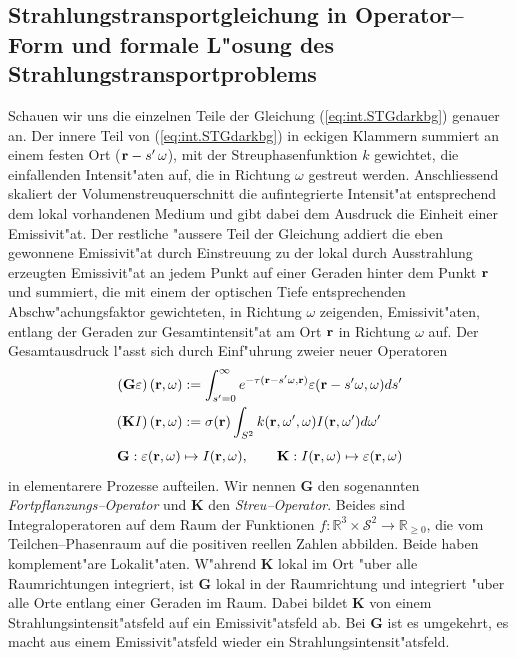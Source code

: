 	\subsection{Strahlungstransportgleichung in Operator--Form und formale L"osung des Strahlungstransportproblems}
	Schauen wir uns die einzelnen Teile der Gleichung (\ref{eq:int.STGdarkbg}) genauer an.
	Der innere Teil von (\ref{eq:int.STGdarkbg}) in eckigen Klammern summiert an einem festen Ort ($\mathbf{r}-s'\,\omega$), mit der Streuphasenfunktion $k$ gewichtet, die einfallenden Intensit"aten auf, die in Richtung $\omega$ gestreut werden. Anschliessend skaliert der Volumenstreuquerschnitt die aufintegrierte Intensit"at entsprechend dem lokal vorhandenen Medium und gibt dabei dem Ausdruck die Einheit einer Emissivit"at.
	Der restliche "aussere Teil der Gleichung addiert die eben gewonnene Emissivit"at durch Einstreuung zu der lokal durch Ausstrahlung erzeugten Emissivit"at an jedem Punkt auf einer Geraden hinter dem Punkt $\mathbf{r}$ und summiert, die mit einem der optischen Tiefe entsprechenden Abschw"achungsfaktor gewichteten, in Richtung $\omega$ zeigenden, Emissivit"aten, entlang der Geraden zur Gesamtintensit"at am Ort $\mathbf{r}$ in Richtung $\omega$ auf.
	Der Gesamtausdruck l"asst sich durch Einf"uhrung zweier neuer Operatoren
	\begin{align*}
		\left(\mathbf{G}\varepsilon\right)(\mathbf{r},\omega)&:=\int_{s'=0}^\infty e^{-\tau(\mathbf{r}-s' \omega,\mathbf{r})}\varepsilon(\mathbf{r}-s' \omega,\omega) ds' \\
		\left(\mathbf{K}I\right)(\mathbf{r},\omega)&:=\sigma(\mathbf{r})\int_{S^2} k(\mathbf{r},\omega',\omega) I(\mathbf{r},\omega') d\omega'
	\end{align*}
	\begin{equation*}
		\mathbf{G} : \varepsilon(\mathbf{r},\omega) \mapsto I(\mathbf{r},\omega) , \qquad
		\mathbf{K} : I(\mathbf{r},\omega) \mapsto \varepsilon(\mathbf{r},\omega)
	\end{equation*}
	in elementarere Prozesse aufteilen. Wir nennen $\mathbf{G}$ den sogenannten {\em Fortpflanzungs--Operator} und $\mathbf{K}$ den {\em Streu--Operator}. Beides sind Integraloperatoren auf dem Raum der Funktionen $f : \mathbb{R}^3 \times \mathcal{S}^2 \to \mathbb{R}_{\geq 0}$, die vom Teilchen--Phasenraum auf die positiven reellen Zahlen abbilden. Beide haben komplement"are Lokalit"aten. W"ahrend $\mathbf{K}$ lokal im Ort "uber alle Raumrichtungen integriert, ist $\mathbf{G}$ lokal in der Raumrichtung und integriert "uber alle Orte entlang einer Geraden im Raum. Dabei bildet $\mathbf{K}$ von einem Strahlungsintensit"atsfeld auf ein Emissivit"atsfeld ab. Bei $\mathbf{G}$ ist es umgekehrt, es macht aus einem Emissivit"atsfeld wieder ein Strahlungsintensit"atsfeld.
